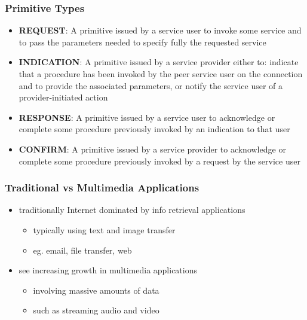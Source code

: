 \documentclass[pdflatex,compress]{beamer}
\begin{document}
\begin{frame}
	\frametitle{Primitive Types}
	\begin{itemize}
		\item \textbf{REQUEST}: A primitive issued by a service user to invoke some service and to pass the parameters needed to specify fully the requested service
		\item \textbf{INDICATION}: A primitive issued by a service provider either to: indicate that a procedure has been invoked by the peer service user on the connection and to provide the associated parameters, or notify the service user of a provider-initiated action
		\item \textbf{RESPONSE}: A primitive issued by a service user to acknowledge or complete some procedure previously invoked by an indication to that user
		\item \textbf{CONFIRM}: A primitive issued by a service provider to acknowledge or complete some procedure previously invoked by a request by the service user
	\end{itemize}
\end{frame}

\begin{frame}
	\frametitle{Traditional vs Multimedia Applications}
	\begin{itemize}
		\item traditionally Internet dominated by info retrieval applications
		\begin{itemize}
			\item typically using text and image transfer
			\item eg. email, file transfer, web
		\end{itemize}
		\item see increasing growth in multimedia applications
		\begin{itemize}
			\item involving massive amounts of data
			\item such as streaming audio and video
		\end{itemize}
	\end{itemize}
\end{frame}
\end{document}
